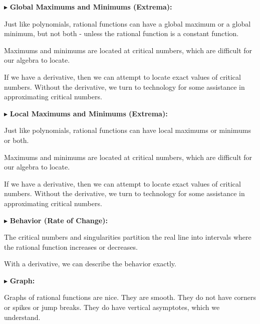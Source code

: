 \documentclass{ximera}
\begin{document}
$\blacktriangleright$ \textbf{\textcolor{red!10!blue!90!}{Global Maximums and Minimums (Extrema):}} 

Just like polynomials, rational functions can have a global maximum or a global minimum, but not both - unless the rational function is a constant function.

Maximums and minimums are located at critical numbers, which are difficult for our algebra to locate.


If we have a derivative, then we can attempt to locate exact values of critical numbers.  Without the derivative, we turn to technology for some assistance in approximating critical numbers.









$\blacktriangleright$ \textbf{\textcolor{red!10!blue!90!}{Local Maximums and Minimums (Extrema):}} 

Just like polynomials, rational functions can have local maximums or minimums or both.

Maximums and minimums are located at critical numbers, which are difficult for our algebra to locate.


If we have a derivative, then we can attempt to locate exact values of critical numbers.  Without the derivative, we turn to technology for some assistance in approximating critical numbers.






$\blacktriangleright$ \textbf{\textcolor{red!10!blue!90!}{Behavior (Rate of Change):}} 


The critical numbers and singularities partition the real line into intervals where the rational function increases or decreases.  

With a derivative, we can describe the behavior exactly.

















$\blacktriangleright$ \textbf{\textcolor{red!10!blue!90!}{Graph:}} 


Graphs of rational functions are nice.  They are smooth.  They do not have corners or spikes or jump breaks. They do have vertical asymptotes, which we understand.
\end{document}
